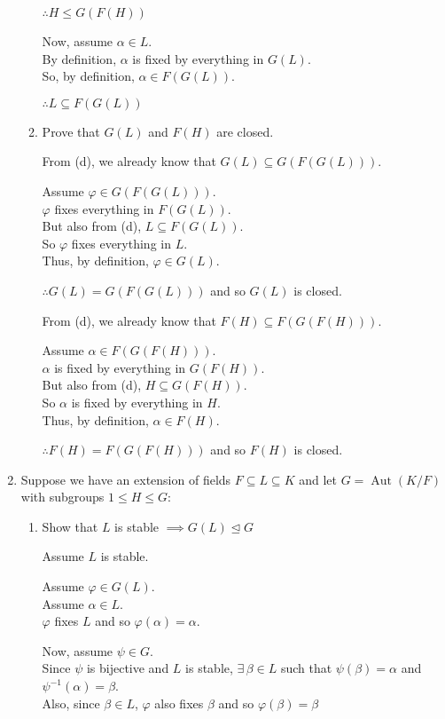 \documentclass[letterpaper,12pt,fleqn]{article}
\DeclareMathOperator{\Aut}{Aut}
\newcommand{\vp}{\varphi}
\renewcommand{\a}{\alpha}
\renewcommand{\a}{\alpha}
\renewcommand{\b}{\beta}
\newcommand{\n}{\trianglelefteq}
\begin{document}
\begin{enumerate}
\begin{enumerate}
    $\therefore H\le G(F(H))$

    Now, assume $\a\in L$. \\
    By definition, $\a$ is fixed by everything in $G(L)$. \\
    So, by definition, $\a\in F(G(L))$.

    $\therefore L\subseteq F(G(L))$

  \item Prove that $G(L)$ and $F(H)$ are closed.

    From (d), we already know that $G(L)\subseteq G(F(G(L)))$.
    
    Assume $\vp\in G(F(G(L)))$. \\
    $\vp$ fixes everything in $F(G(L))$. \\
    But also from (d), $L\subseteq F(G(L))$. \\
    So $\vp$ fixes everything in $L$. \\
    Thus, by definition, $\vp\in G(L)$.
    
    $\therefore G(L)=G(F(G(L)))$ and so $G(L)$ is closed.

    From (d), we already know that $F(H)\subseteq F(G(F(H)))$.

    Assume $\a\in F(G(F(H)))$. \\
    $\a$ is fixed by everything in $G(F(H))$. \\
    But also from (d), $H\subseteq G(F(H))$. \\
    So $\a$ is fixed by everything in $H$. \\
    Thus, by definition, $\a\in F(H)$.

    $\therefore F(H)=F(G(F(H)))$ and so $F(H)$ is closed.
  \end{enumerate}

\item Suppose we have an extension of fields $F\subseteq L\subseteq K$ and let
  $G=\Aut(K/F)$ with subgroups $1\le H\le G$:
  \begin{enumerate}
  \item Show that $L$ is stable $\implies G(L)\n G$
    
    Assume $L$ is stable.

    Assume $\vp\in G(L)$. \\
    Assume $\a\in L$. \\
    $\vp$ fixes $L$ and so $\vp(\a)=\a$.

    Now, assume $\psi\in G$. \\
    Since $\psi$ is bijective and $L$ is stable, $\exists\,\b\in L$ such that
    $\psi(\b)=\a$ and $\psi^{-1}(\a)=\b$. \\
    Also, since $\b\in L$, $\vp$ also fixes $\b$ and so $\vp(\b)=\b$


\end{enumerate}
\end{enumerate}
\end{document}

